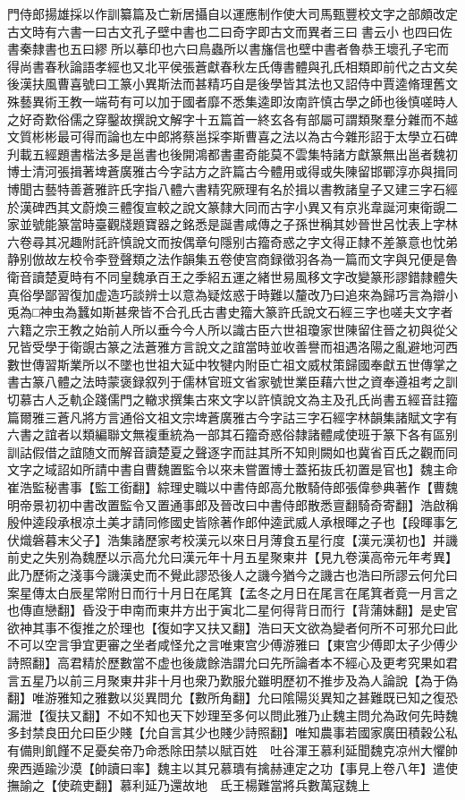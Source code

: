門侍郎揚雄採以作訓纂篇及亡新居攝自以運應制作使大司馬甄豐校文字之部頗改定古文時有六書一曰古文孔子壁中書也二曰奇字即古文而異者三曰書云小也四曰佐書秦隸書也五曰繆所以摹印也六曰鳥蟲所以書旛信也壁中書者魯恭王壞孔子宅而得尚書春秋論語孝經也又北平侯張蒼獻春秋左氏傳書體與孔氏相類即前代之古文矣後漢扶風曹喜號曰工篆小異斯法而甚精巧自是後學皆其法也又詔侍中賈逵脩理舊文殊藝異術王教一端苟有可以加于國者靡不悉集逵即汝南許慎古學之師也後慎嗟時人之好奇歎俗儒之穿鑿故撰說文解字十五篇首一終玄各有部屬可謂類聚羣分雜而不越文質彬彬最可得而論也左中郎將蔡邕採李斯曹喜之法以為古今雜形詔于太學立石碑刋載五經題書楷法多是邕書也後開鴻都書畫奇能莫不雲集特諸方獻篆無出邕者魏初博士清河張揖著埤蒼廣雅古今字詁方之許篇古今體用或得或失陳留邯鄲淳亦與揖同博聞古藝特善蒼雅許氏字指八體六書精究厥理有名於揖以書教諸皇子又建三字石經於漢碑西其文蔚煥三體復宣較之說文篆隸大同而古字小異又有京兆韋誕河東衛覬二家並號能篆當時臺觀牋題寶器之銘悉是誕書咸傳之子孫世稱其妙晉世呂忱表上字林六卷尋其况趣附託許慎說文而按偶章句隱别古籀奇惑之字文得正隸不差篆意也忱弟静别倣故左校令李登聲類之法作韻集五卷使宫商録徵羽各為一篇而文字與兄便是魯衛音讀楚夏時有不同皇魏承百王之季紹五運之緒世易風移文字改變篆形謬錯隸體失真俗學鄙習復加虚造巧談辨士以意為疑炫惑于時難以釐改乃曰追來為歸巧言為辯小兎為□神虫為蠶如斯甚衆皆不合孔氏古書史籀大篆許氏說文石經三字也嗟夫文字者六籍之宗王教之始前人所以垂今今人所以識古臣六世祖瓊家世陳留住晉之初與從父兄皆受學于衛覬古篆之法蒼雅方言說文之誼當時並收善譽而祖遇洛陽之亂避地河西數世傳習斯業所以不墜也世祖大延中牧犍内附臣亡祖文威杖策歸國奉獻五世傳掌之書古篆八體之法時蒙褒録叙列于儒林官班文省家號世業臣藉六世之資奉遵祖考之訓切慕古人乏軌企踐儒門之轍求撰集古來文字以許慎說文為主及孔氏尚書五經音註籀篇爾雅三蒼凡將方言通俗文祖文宗埤蒼廣雅古今字詁三字石經字林韻集諸賦文字有六書之誼者以類編聯文無複重統為一部其石籀奇惑俗隸諸體咸使班于篆下各有區别訓詁假借之誼随文而解音讀楚夏之聲逐字而註其所不知則闕如也冀省百氏之觀而同文字之域詔如所請中書自曹魏置監令以來未嘗置博士蓋拓抜氏初置是官也】魏主命崔浩監秘書事【監工銜翻】綜理史職以中書侍郎高允散騎侍郎張偉參典著作【曹魏明帝景初初中書改置監令又置通事郎及晉改曰中書侍郎散悉亶翻騎奇寄翻】浩啟稱殷仲逵段承根凉土美才請同修國史皆除著作郎仲逵武威人承根暉之子也【段暉事乞伏熾磐暮末父子】浩集諸歷家考校漢元以來日月薄食五星行度【漢元漢初也】并譏前史之失别為魏歷以示高允允曰漢元年十月五星聚東井【見九卷漢高帝元年考異】此乃歷術之淺事今譏漢史而不覺此謬恐後人之譏今猶今之譏古也浩曰所謬云何允曰案星傳太白辰星常附日而行十月日在尾箕【孟冬之月日在尾言在尾箕者竟一月言之也傳直戀翻】昏没于申南而東井方出于寅北二星何得背日而行【背蒲妹翻】是史官欲神其事不復推之於理也【復如字又扶又翻】浩曰天文欲為變者何所不可邪允曰此不可以空言爭宜更審之坐者咸怪允之言唯東宫少傅游雅曰【東宫少傅即太子少傅少詩照翻】高君精於歷數當不虚也後歲餘浩謂允曰先所論者本不經心及更考究果如君言五星乃以前三月聚東井非十月也衆乃歎服允雖明歷初不推步及為人論說【為于偽翻】唯游雅知之雅數以災異問允【數所角翻】允曰隂陽災異知之甚難既已知之復恐漏泄【復扶又翻】不如不知也天下妙理至多何以問此雅乃止魏主問允為政何先時魏多封禁良田允曰臣少賤【允自言其少也賤少詩照翻】唯知農事若國家廣田積穀公私有備則飢饉不足憂矣帝乃命悉除田禁以賦百姓　吐谷渾王慕利延聞魏克凉州大懼帥衆西遁踰沙漠【帥讀曰率】魏主以其兄慕璝有擒赫連定之功【事見上卷八年】遣使撫諭之【使疏吏翻】慕利延乃還故地　氐王楊難當將兵數萬寇魏上